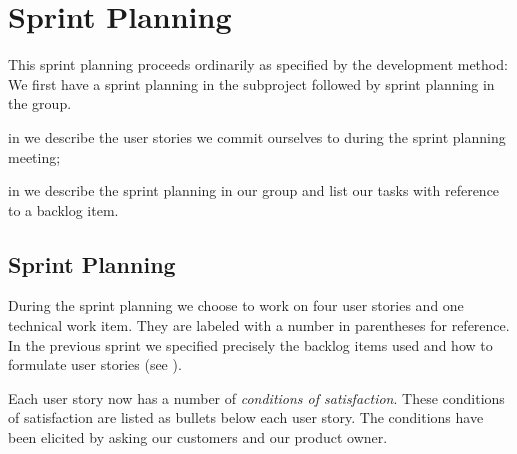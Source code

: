 \chapter{Sprint Planning}\label{chap:s4_sprintplanning}
This sprint planning proceeds ordinarily as specified by the development method: We first have a sprint planning in the subproject followed by sprint planning in the group.

\begin{chapterorganization}
  \item in  we describe the user stories we commit ourselves to during the \bd sprint planning meeting;
  \item in  we describe the sprint planning in our group and list our tasks with reference to a backlog item.
\end{chapterorganization}

\section{\bdtitle Sprint Planning}\label{sec:S4_bd}
During the \bd sprint planning we choose to work on four user stories and one technical work item. They are labeled with a number in parentheses for reference. In the previous sprint we specified precisely the backlog items used and how to formulate user stories (see ).

Each user story now has a number of \emph{conditions of satisfaction}. These conditions of satisfaction are listed as bullets below each user story. The conditions have been elicited by asking our customers and our product owner.

